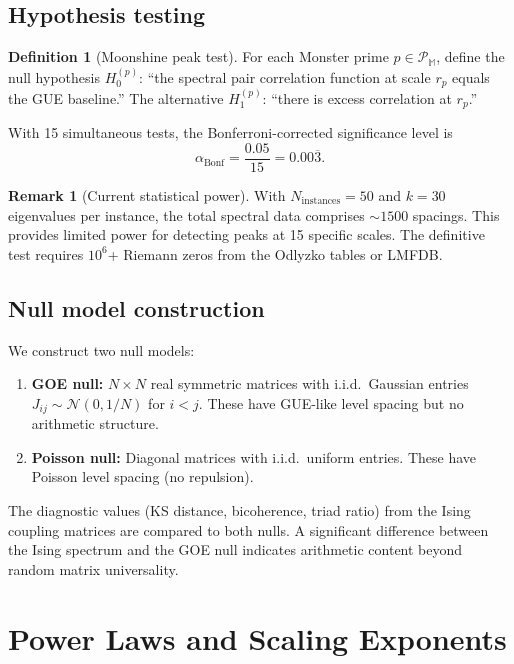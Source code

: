 \documentclass[11pt]{amsart}
\theoremstyle{definition}
\newtheorem{definition}[theorem]{Definition}
\newtheorem{remark}[theorem]{Remark}
\begin{document}
\subsection{Hypothesis testing}

\begin{definition}[Moonshine peak test]
For each Monster prime $p \in \mathcal{P}_{\mathbb{M}}$, define the null hypothesis $H_0^{(p)}$: ``the spectral pair correlation function at scale $r_p$ equals the GUE baseline.'' The alternative $H_1^{(p)}$: ``there is excess correlation at $r_p$.''

With 15 simultaneous tests, the Bonferroni-corrected significance level is
\[
\alpha_{\mathrm{Bonf}} = \frac{0.05}{15} = 0.00\overline{3}.
\]
\end{definition}

\begin{remark}[Current statistical power]
With $N_{\mathrm{instances}} = 50$ and $k = 30$ eigenvalues per instance, the total spectral data comprises $\sim 1500$ spacings. This provides limited power for detecting peaks at 15 specific scales. The definitive test requires $10^6$+ Riemann zeros from the Odlyzko tables or LMFDB.
\end{remark}

\subsection{Null model construction}

We construct two null models:
\begin{enumerate}[label=(\roman*)]
\item \textbf{GOE null:} $N \times N$ real symmetric matrices with i.i.d.\ Gaussian entries $J_{ij} \sim \mathcal{N}(0, 1/N)$ for $i < j$. These have GUE-like level spacing but no arithmetic structure.
\item \textbf{Poisson null:} Diagonal matrices with i.i.d.\ uniform entries. These have Poisson level spacing (no repulsion).
\end{enumerate}

The diagnostic values (KS distance, bicoherence, triad ratio) from the Ising coupling matrices are compared to both nulls. A significant difference between the Ising spectrum and the GOE null indicates arithmetic content beyond random matrix universality.


\section{Power Laws and Scaling Exponents}
\label{sec:powerlaws}
\end{document}
